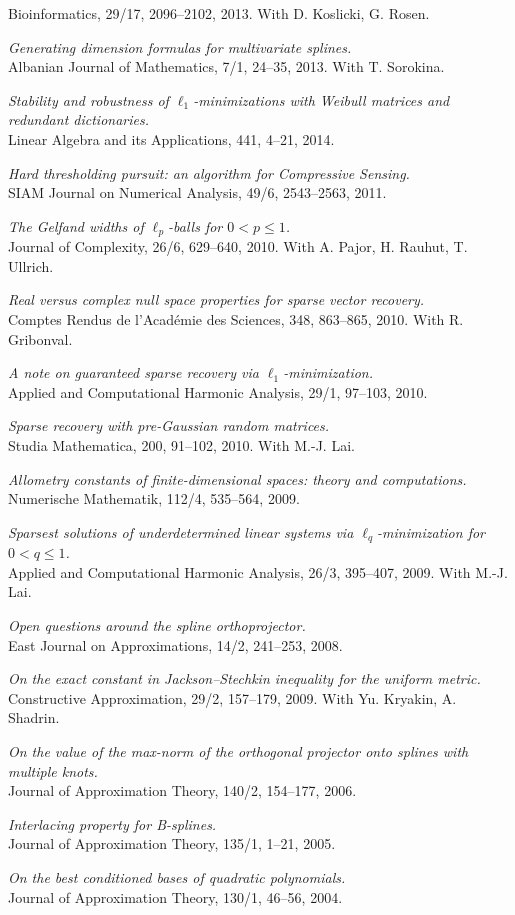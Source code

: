 \documentclass[11pt]{article}
\begin{document}
Bioinformatics, 29/17, 2096--2102, 2013. 
With D. Koslicki, G. Rosen.
\item {\sl Generating dimension formulas for multivariate splines.}\\
Albanian Journal of Mathematics, 7/1, 24--35, 2013.
 With T. Sorokina.
\item {\sl Stability and robustness of $\ell_1$-minimizations with Weibull matrices and redundant dictionaries.}\\
Linear Algebra and its Applications, 441, 4--21, 2014.
\item {\sl Hard thresholding pursuit: an algorithm for Compressive Sensing.}\\
SIAM Journal on Numerical Analysis, 49/6, 2543--2563, 2011.
\item {\sl The Gelfand widths of $\ell_p$-balls for $0<p \le 1$.}\\
Journal of Complexity, 26/6, 629--640, 2010. 
With A. Pajor, H. Rauhut, T. Ullrich.
\item {\sl Real versus complex null space properties for sparse vector recovery.}\\
Comptes Rendus de l'Acad\'emie des Sciences, 348, 863--865, 2010. 
With R. Gribonval.
\item {\sl A note on guaranteed sparse recovery via $\ell_1$-minimization.}\\
Applied and Computational Harmonic Analysis, 29/1, 97--103, 2010.
\item {\sl Sparse recovery with pre-Gaussian random matrices.}\\
Studia Mathematica, 200, 91--102, 2010. 
With M.-J. Lai.
\item {\sl Allometry constants of finite-dimensional spaces: theory and computations.}\\
Numerische Mathematik,  112/4, 535--564, 2009.
\item {\sl  Sparsest solutions of underdetermined linear systems via $\ell_q$-minimization for $0 <  q  \le  1$.}\\
Applied and Computational Harmonic Analysis, 26/3, 395--407, 2009. 
With M.-J. Lai.
\item {\sl Open questions around the spline orthoprojector.}\\
East Journal on Approximations, 14/2, 241--253, 2008.
\item {\sl On the exact constant in Jackson--Stechkin inequality for the uniform metric.}\\
Constructive Approximation, 29/2, 157--179, 2009. 
With Yu. Kryakin, A. Shadrin.
\item {\sl On the value of the max-norm of the orthogonal projector onto splines with multiple knots.}\\
Journal of Approximation Theory, 140/2, 154--177, 2006.
\item {\sl  Interlacing property for B-splines.}\\
Journal of Approximation Theory, 135/1, 1--21, 2005.
\item {\sl On the best conditioned bases of quadratic polynomials.}\\
Journal of Approximation Theory, 130/1, 46--56, 2004.
\eetaremune
	
\end{document}
